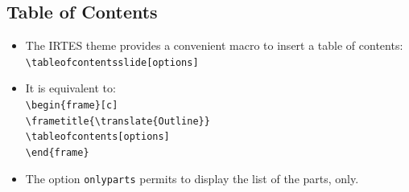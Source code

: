\documentclass[english,circlenumberstyle]{irtesbeamer}
\begin{document}
\subsection{Table of Contents}
\begin{frame}{\subsecname}
	\begin{itemize}
	\item The IRTES theme provides a convenient macro to insert a table of contents: \\
		\texttt{{\textbackslash}tableofcontentsslide[options]}
	\item It is equivalent to: \\
		\texttt{{\textbackslash}begin\{frame\}[c]} \\
		\texttt{{\textbackslash}frametitle\{{\textbackslash}translate\{Outline\}\}} \\
		\texttt{{\textbackslash}tableofcontents[options]} \\
		\texttt{{\textbackslash}end\{frame\}}
	\item The option \texttt{onlyparts} permits to display the list of the parts, only.
	\end{itemize}
\end{frame}
\end{document}
